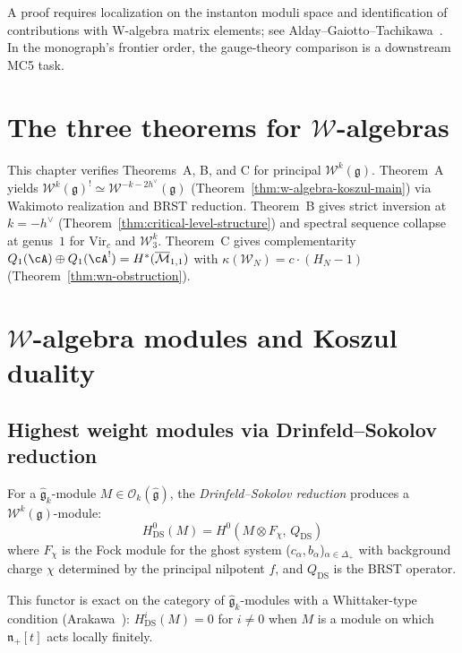 \begin{remark}
A proof requires localization on the instanton moduli space and identification of contributions with W-algebra matrix elements; see Alday--Gaiotto--Tachikawa~\cite{AGT09}.  In the monograph's frontier order, the gauge-theory comparison is a downstream MC5 task.
\end{remark}


\section{The three theorems for $\mathcal{W}$-algebras}

\begin{remark}
\label{rem:w-algebra-three-theorems}
This chapter verifies Theorems~A, B, and C for principal $\mathcal{W}^k(\mathfrak{g})$.
Theorem~A yields $\mathcal{W}^k(\mathfrak{g})^! \simeq \mathcal{W}^{-k-2h^\vee}(\mathfrak{g})$ (Theorem~\ref{thm:w-algebra-koszul-main}) via Wakimoto realization and BRST reduction.
Theorem~B gives strict inversion at $k = -h^\vee$ (Theorem~\ref{thm:critical-level-structure}) and spectral sequence collapse at genus~$1$ for $\mathrm{Vir}_c$ and $\mathcal{W}_3^k$.
Theorem~C gives complementarity $Q_1(\cA) \oplus Q_1(\cA^!) = H^*(\overline{\mathcal{M}}_{1,1})$ with $\kappa(\mathcal{W}_N) = c \cdot (H_N - 1)$ (Theorem~\ref{thm:wn-obstruction}).
\end{remark}

\section{$\mathcal{W}$-algebra modules and Koszul duality}
\label{sec:w-algebra-modules}

\subsection{Highest weight modules via Drinfeld--Sokolov reduction}

\begin{definition}
\label{def:w-module-ds}
For a $\widehat{\mathfrak{g}}_k$-module $M \in
\mathcal{O}_k(\widehat{\mathfrak{g}})$, the
\emph{Drinfeld--Sokolov reduction} produces a
$\mathcal{W}^k(\mathfrak{g})$-module:
\[
H^0_{\mathrm{DS}}(M) = H^0(M \otimes F_{\chi},\, Q_{\mathrm{DS}})
\]
where $F_\chi$ is the Fock module for the ghost system
($c_\alpha, b_\alpha$)$_{\alpha \in \Delta_+}$ with background charge
$\chi$ determined by the principal nilpotent $f$, and
$Q_{\mathrm{DS}}$ is the BRST operator.

This functor is exact on the category of $\widehat{\mathfrak{g}}_k$-modules
with a Whittaker-type condition (Arakawa~\cite{Arakawa17}): $H^i_{\mathrm{DS}}(M)
= 0$ for $i \neq 0$ when $M$ is a module on which
$\mathfrak{n}_+[t]$ acts locally finitely.
\end{definition}


